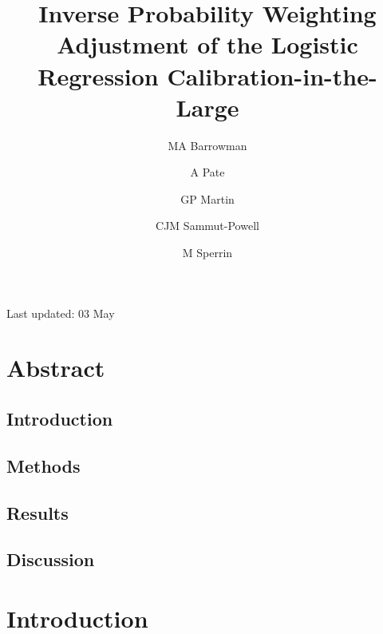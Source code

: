 \documentclass[
]{article}
\title{Inverse Probability Weighting Adjustment of the Logistic Regression Calibration-in-the-Large}
\author{MA Barrowman \and A Pate \and GP Martin \and CJM Sammut-Powell \and M Sperrin}
\date{}
\begin{document}
\maketitle

{
\setcounter{tocdepth}{2}
\tableofcontents
}
Last updated: 03 May

\hypertarget{abstract}{%
\section*{Abstract}\label{abstract}}

\hypertarget{introduction}{%
\subsection*{Introduction}\label{introduction}}

\hypertarget{methods}{%
\subsection*{Methods}\label{methods}}

\hypertarget{results}{%
\subsection*{Results}\label{results}}

\hypertarget{discussion}{%
\subsection*{Discussion}\label{discussion}}

\hypertarget{introduction-1}{%
\section{Introduction}\label{introduction-1}}
\end{document}
